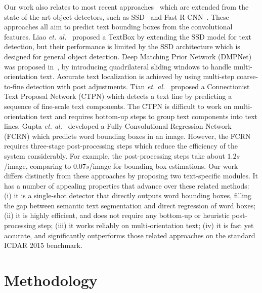 \documentclass[10pt,twocolumn,letterpaper]{article}
\begin{document}
Our work also relates to most recent approaches~\cite{Liu2017, Tian2016, Liao2017, Gupta2016, Zhou2017, Shi2017} which are extended from the state-of-the-art object detectors, such as SSD~\cite{liu2016SSD} and Fast R-CNN~\cite{Ren2015}. These approaches all aim to predict text bounding boxes from the convolutional features. Liao \textit{et. al.}~\cite{Liao2017} proposed a TextBox by extending the SSD model for text detection, but their performance is limited by the SSD architecture which is designed for general object detection. Deep Matching Prior Network (DMPNet) was proposed in~\cite{Liu2017}, by introducing quadrilateral sliding windows to handle multi-orientation text. Accurate text localization is achieved by using multi-step coarse-to-fine detection with post adjustments. Tian \textit{et. al.}~\cite{Tian2016} proposed a Connectionist Text Proposal Network (CTPN) which detects a text line by predicting a sequence of fine-scale text components. The CTPN is difficult to work on multi-orientation text and requires bottom-up steps to group text components into text lines. Gupta \textit{et. al.}~\cite{Gupta2016} developed a Fully Convolutional Regression Network (FCRN) which predicts word bounding boxes in an image. However, the FCRN requires three-stage post-processing steps which reduce the efficiency of the system considerably. For example, the post-processing steps take about $1.2s$/image, comparing to $0.07s$/image for bounding box estimations. Our work differs distinctly from these approaches by proposing two text-specific modules. It has a number of appealing properties that advance over these related methods: (i) it is a single-shot detector that directly outputs word bounding boxes, filling the gap between semantic text segmentation and direct regression of word boxes; (ii) it is highly efficient, and does not require any bottom-up or heuristic post-processing step; (iii) it works reliably on multi-orientation text; (iv) it is fast yet accurate, and significantly outperforms those related approaches on the standard ICDAR 2015 benchmark.


\section{Methodology}
\end{document}
